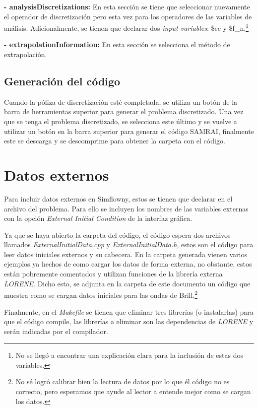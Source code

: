 \documentclass[11pt]{article}
\begin{document}
{\bf - analysisDiscretizations:}
En esta sección se tiene que seleccionar nuevamente el operador de discretización pero esta vez para los operadores de las variables de análisis. Adicionalmente, se tienen que declarar dos {\itshape input variables}: \$cc y \$f\_n.\footnote{No se llegó a encontrar una explicación clara para la inclusión de estas dos variables.}

{\bf - extrapolationInformation:}
En esta sección se selecciona el método de extrapolación.

\subsection{Generación del código}
Cuando la póliza de discretización esté completada, se utiliza un botón de la barra de herramientas superior para generar el problema discretizado. Una vez que se tenga el problema discretizado, se selecciona este último y se vuelve a utilizar un botón en la barra superior para generar el código SAMRAI, finalmente este se descarga y se descomprime para obtener la carpeta con el código.

\section{Datos externos}

Para incluir datos externos en Simflowny, estos se tienen que declarar en el archivo del problema. Para ello se incluyen los nombres de las variables externas con la opción {\itshape External Initial Condition} de la interfaz gráfica.

Ya que se haya abierto la carpeta del código, el código espera dos archivos llamados {\itshape ExternalInitialData.cpp} y {\itshape ExternalInitialData.h}, estos son el código para leer datos iniciales externos y su cabecera. En la carpeta generada vienen varios ejemplos ya hechos de como cargar los datos de forma externa, no obstante, estos están pobremente comentados y utilizan funciones de la librería externa {\itshape LORENE}. Dicho esto, se adjunta en la carpeta de este documento un código que muestra como se cargan datos iniciales para las ondas de Brill.\footnote{No sé logró calibrar bien la lectura de datos por lo que él código no es correcto, pero esperamos que ayude al lector a entende mejor como se cargan los datos.}

Finalmente, en el {\itshape Makefile} se tienen que eliminar tres librerías (o instalarlas) para que el código compile, las librerías a eliminar son las dependencias de {\itshape LORENE} y serán indicadas por el compilador.
\end{document}
